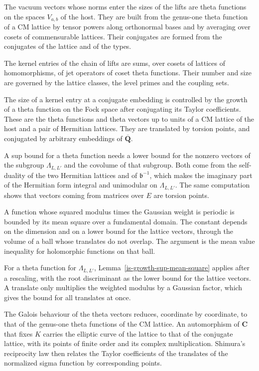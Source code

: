 The vacuum vectors whose norms enter the sizes of the lifts are theta functions on the spaces
$V_{a,b}$ of the host. They are built from the genus-one theta function of a CM lattice by tensor
powers along orthonormal bases and by averaging over cosets of commensurable lattices. Their
conjugates are formed from the conjugates of the lattice and of the types.

The kernel entries of the chain of lifts are sums, over cosets of lattices of homomorphisms, of jet
operators of coset theta functions. Their number and size are governed by the lattice classes, the
level primes and the coupling sets.

The size of a kernel entry at a conjugate embedding is controlled by the growth of a theta function
on the Fock space after conjugating its Taylor coefficients. These are the theta functions and theta
vectors up to units of a CM lattice of the host and a pair of Hermitian lattices. They are translated
by torsion points, and conjugated by arbitrary embeddings of $\overline{\mathbf Q}$.

A sup bound for a theta function needs a lower bound for the nonzero vectors of the subgroup
$\Lambda_{L,L'}$ and the covolume of that subgroup. Both come from the self-duality of the two
Hermitian lattices and of $\mathfrak b^{-1}$, which makes the imaginary part of the Hermitian form
integral and unimodular on $\Lambda_{L,L'}$. The same computation shows that vectors coming from
matrices over $E$ are torsion points.

A function whose squared modulus times the Gaussian weight is periodic is bounded by its mean square
over a fundamental domain. The constant depends on the dimension and on a lower bound for the lattice
vectors, through the volume of a ball whose translates do not overlap. The argument is the mean value
inequality for holomorphic functions on that ball.

For a theta function for $\Lambda_{L,L'}$, Lemma~\ref{is-growth-sup-mean-square} applies after a
rescaling, with the root discriminant as the lower bound for the lattice vectors. A translate only
multiplies the weighted modulus by a Gaussian factor, which gives the bound for all translates at
once.

The Galois behaviour of the theta vectors reduces, coordinate by coordinate, to that of the genus-one
theta functions of the CM lattice. An automorphism of $\mathbf C$ that fixes $K$ carries the elliptic
curve of the lattice to that of the conjugate lattice, with its points of finite order and its complex
multiplication. Shimura's reciprocity law then relates the Taylor coefficients of the translates of the
normalized sigma function by corresponding points.

